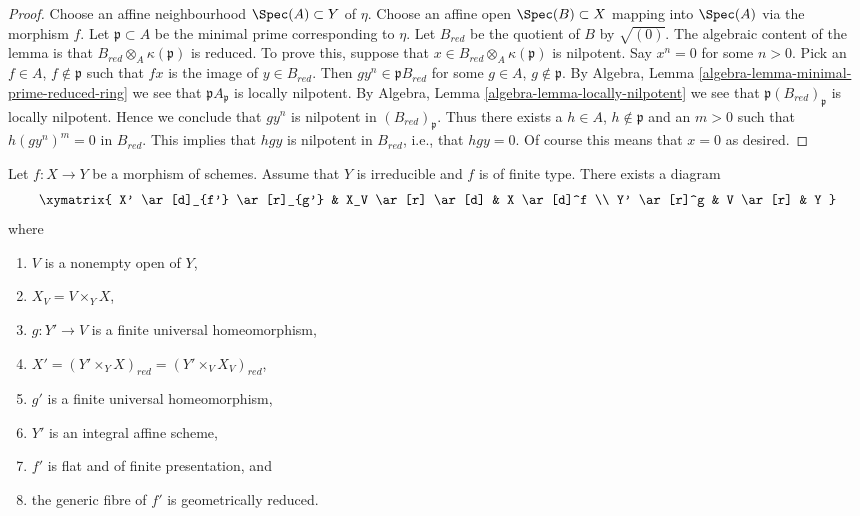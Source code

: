 \begin{proof}
Choose an affine neighbourhood $\Spec(A) \subset Y$ of $\eta$.
Choose an affine open $\Spec(B) \subset X$ mapping into $\Spec(A)$
via the morphism $f$. Let $\mathfrak p \subset A$ be the minimal prime
corresponding to $\eta$. Let $B_{red}$ be the quotient of $B$ by
$\sqrt{(0)}$. The algebraic content of the lemma is that
$B_{red} \otimes_A \kappa(\mathfrak p)$ is reduced. To prove this, suppose
that $x \in B_{red} \otimes_A \kappa(\mathfrak p)$ is nilpotent. Say
$x^n = 0$ for some $n > 0$.
Pick an $f \in A$, $f \not \in \mathfrak p$ such that
$fx$ is the image of $y \in B_{red}$. Then $gy^n \in \mathfrak pB_{red}$ for
some $g \in A$, $g \not \in \mathfrak p$. By
Algebra, Lemma \ref{algebra-lemma-minimal-prime-reduced-ring}
we see that $\mathfrak pA_{\mathfrak p}$ is locally nilpotent. By
Algebra, Lemma \ref{algebra-lemma-locally-nilpotent}
we see that $\mathfrak p(B_{red})_{\mathfrak p}$ is locally nilpotent.
Hence we conclude that $gy^n$ is nilpotent in $(B_{red})_{\mathfrak p}$.
Thus there exists a $h \in A$, $h \not \in \mathfrak p$ and an $m > 0$
such that $h(gy^n)^m = 0$ in $B_{red}$. This implies that
$hgy$ is nilpotent in $B_{red}$, i.e., that $hgy = 0$. Of course this
means that $x = 0$ as desired.
\end{proof}

\begin{lemma}
\label{lemma-make-generic-fibre-geometrically-reduced}
Let $f : X \to Y$ be a morphism of schemes.
Assume that $Y$ is irreducible and $f$ is of finite type.
There exists a diagram
$$
\xymatrix{
X' \ar[d]_{f'} \ar[r]_{g'} & X_V \ar[r] \ar[d] & X \ar[d]^f \\
Y' \ar[r]^g & V \ar[r] & Y
}
$$
where
\begin{enumerate}
\item $V$ is a nonempty open of $Y$,
\item $X_V = V \times_Y X$,
\item $g : Y' \to V$ is a finite universal homeomorphism,
\item $X' = (Y' \times_Y X)_{red} = (Y' \times_V X_V)_{red}$,
\item $g'$ is a finite universal homeomorphism,
\item $Y'$ is an integral affine scheme,
\item $f'$ is flat and of finite presentation, and
\item the generic fibre of $f'$ is geometrically reduced.
\end{enumerate}
\end{lemma}

